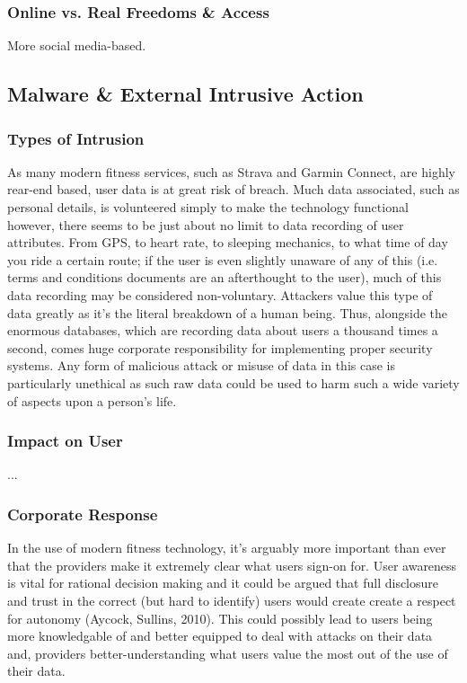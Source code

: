 \documentclass[11pt, english]{article}
\begin{document}
		\subsubsection{Online vs. Real Freedoms \& Access}

	More social media-based.\\

	\subsection{Malware \& External Intrusive Action}

		\subsubsection{Types of Intrusion}

	As many modern fitness services, such as Strava and Garmin Connect, are highly rear-end based, user data is at great risk of breach. Much data associated, such as personal details, is volunteered simply to make the technology functional however, there seems to be just about no limit to data recording of user attributes. From GPS, to heart rate, to sleeping mechanics, to what time of day you ride a certain route; if the user is even slightly unaware of any of this (i.e. terms and conditions documents are an afterthought to the user), much of this data recording may be considered non-voluntary. Attackers value this type of data greatly as it's the literal breakdown of a human being. Thus, alongside the enormous databases, which are recording data about users a thousand times a second, comes huge corporate responsibility for implementing proper security systems. Any form of malicious attack or misuse of data in this case is particularly unethical as such raw data could be used to harm such a wide variety of aspects upon a person's life.

		\subsubsection{Impact on User}

	...

		\subsubsection{Corporate Response}

	In the use of modern fitness technology, it's arguably more important than ever that the providers make it extremely clear what users sign-on for. User awareness is vital for rational decision making and it could be argued that full disclosure and trust in the correct (but hard to identify) users would create create a respect for autonomy (Aycock, Sullins, 2010). This could possibly lead to users being more knowledgable of and better equipped to deal with attacks on their data and, providers better-understanding what users value the most out of the use of their data.\\
\end{document}
